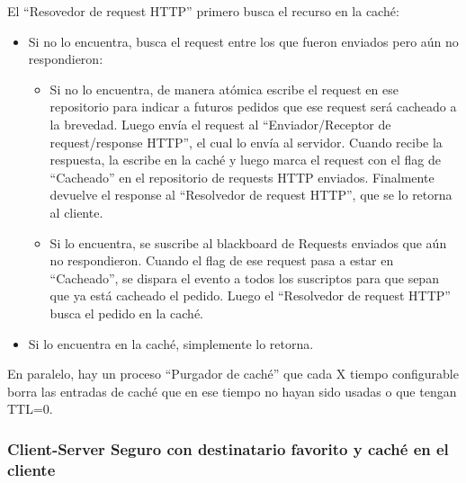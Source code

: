 El ``Resovedor de request HTTP'' primero busca el recurso en la caché:
\begin{itemize}
	\item Si no lo encuentra, busca el request entre los que fueron enviados pero aún no respondieron:
	\begin{itemize}
		\item Si no lo encuentra, de manera atómica escribe el request en ese repositorio para indicar a futuros
        pedidos que ese request será cacheado a la brevedad. Luego envía el request al ``Enviador/Receptor de
        request/response HTTP'', el cual lo envía al servidor. Cuando recibe la respuesta, la escribe en la caché
        y luego marca el request con el flag de ``Cacheado'' en el repositorio de requests HTTP enviados. Finalmente
        devuelve el response al ``Resolvedor de request HTTP'', que se lo retorna al cliente.
        
        \item Si lo encuentra, se suscribe al blackboard de Requests enviados que aún no respondieron.
        Cuando el flag de ese request pasa a estar en ``Cacheado'', se dispara el evento
        a todos los suscriptos para que sepan que ya está cacheado el pedido. Luego el ``Resolvedor de
        request HTTP'' busca el pedido en la caché.
	\end{itemize}
	
	\item  Si lo encuentra en la caché, simplemente lo retorna.
\end{itemize}

En paralelo, hay un proceso ``Purgador de caché'' que cada X tiempo configurable borra las entradas
de caché que en ese tiempo no hayan sido usadas o que tengan TTL=0.


\subsubsection{Client-Server Seguro con destinatario favorito y caché en el cliente}


